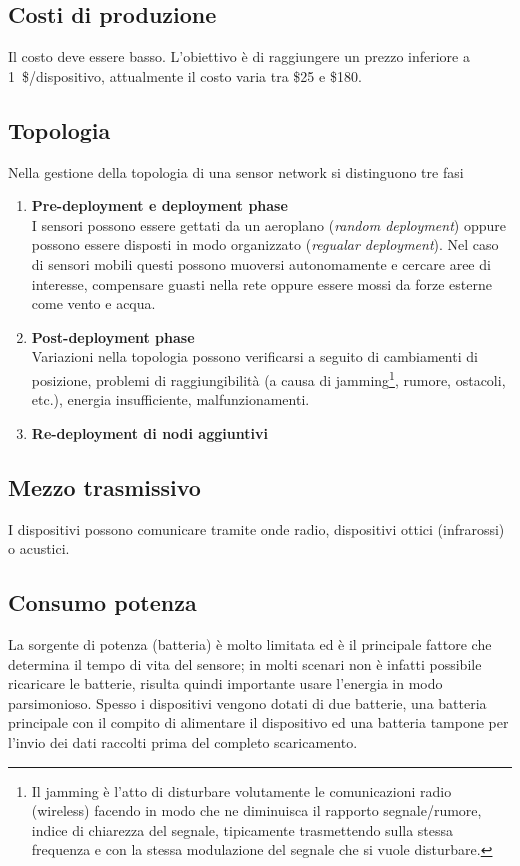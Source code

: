 \subsection{Costi di produzione}
	Il costo deve essere basso.
	L'obiettivo è di raggiungere un prezzo inferiore a 1~\$/dispositivo, attualmente il costo varia tra \$25 e \$180.
	
\subsection{Topologia}
	Nella gestione della topologia di una sensor network si distinguono tre fasi
	\begin{enumerate}
		\item \textbf{Pre-deployment e deployment phase}\\
			I sensori possono essere gettati da un aeroplano (\emph{random deployment}) oppure possono essere disposti in modo organizzato (\emph{regualar deployment}).
			Nel caso di sensori mobili questi possono muoversi autonomamente e cercare aree di interesse, compensare  guasti nella rete oppure essere mossi da forze esterne come vento e acqua.
			
		\item \textbf{Post-deployment phase}\\
			Variazioni nella topologia possono verificarsi a seguito di cambiamenti di posizione, problemi di raggiungibilità (a causa di jamming\footnote{Il jamming è l'atto di disturbare volutamente le comunicazioni radio (wireless) facendo in modo che ne diminuisca il rapporto segnale/rumore, indice di chiarezza del segnale, tipicamente trasmettendo sulla stessa frequenza e con la stessa modulazione del segnale che si vuole disturbare.},
			rumore, ostacoli, etc.), energia insufficiente, malfunzionamenti.
		
		\item \textbf{Re-deployment di nodi aggiuntivi}\\
	\end{enumerate}

\subsection{Mezzo trasmissivo}
	I dispositivi possono comunicare tramite onde radio, dispositivi ottici (infrarossi) o acustici.
	
\subsection{Consumo potenza}
	La sorgente di potenza (batteria) è molto limitata ed è il principale fattore che determina il tempo di vita del sensore; in molti scenari non è infatti possibile ricaricare le batterie, risulta quindi importante usare l'energia in modo parsimonioso.
	Spesso i dispositivi vengono dotati di due batterie, una batteria principale con il compito di alimentare il dispositivo ed una batteria tampone per l'invio dei dati raccolti prima del completo scaricamento.
	
